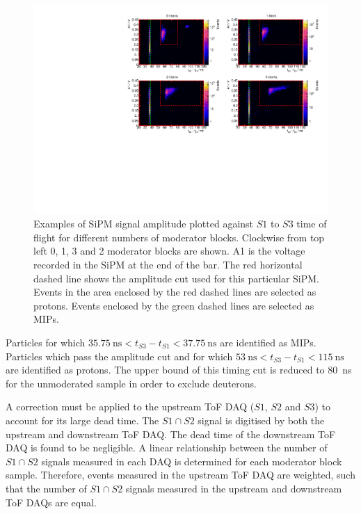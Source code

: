 \begin{figure}[ht]
  \centering
  \includegraphics[width=\linewidth]{files/Figures/tvsa.pdf}
  \caption{Examples of SiPM signal amplitude plotted against $\mathit{S1}$ to $\mathit{S3}$ time of flight for different numbers of moderator blocks. Clockwise from top left 0, 1, 3 and 2 moderator blocks are shown. A1 is the voltage recorded in the SiPM at the end of the bar. The red horizontal dashed line shows the amplitude cut used for this particular SiPM. Events in the area enclosed by the red dashed lines are selected as protons. Events enclosed by the green dashed lines are selected as MIPs.}
  \label{fig:TvsA}
\end{figure}

Particles for which $35.75~\text{ns}<t_{\mathit{S3}}-t_{\mathit{S1}}<37.75~\text{ns}$ are identified as MIPs.
Particles which pass the amplitude cut and for which $53~\text{ns}<t_{\mathit{S3}}-t_{\mathit{S1}}<115~\text{ns}$ are identified as protons.
The upper bound of this timing cut is reduced to 80~ns for the unmoderated sample in order to exclude deuterons.

A correction must be applied to the upstream ToF DAQ ($\mathit{S1}$, $\mathit{S2}$ and $\mathit{S3}$) to account for its large dead time.
The $\mathit{S1} \cap \mathit{S2}$ signal is digitised by both the upstream and downstream ToF DAQ.
The dead time of the downstream ToF DAQ is found to be negligible.
A linear relationship between the number of $\mathit{S1} \cap \mathit{S2}$ signals measured in each DAQ is determined for each moderator block sample.
Therefore, events measured in the upstream ToF DAQ are weighted, such that the number of $\mathit{S1} \cap \mathit{S2}$ signals measured in the upstream and downstream ToF DAQs are equal.

